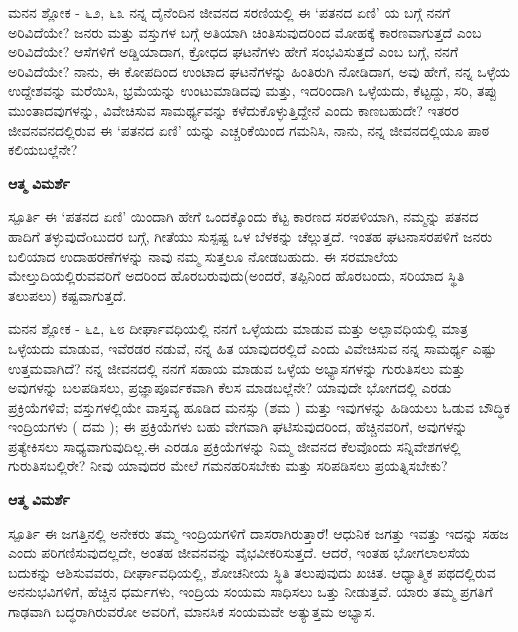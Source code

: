 \newpage
\begin{mananam}{\mananamfont \large {ಮನನ ಶ್ಲೋಕ - ೬೨, ೬೩}}
\footnotesize \mananamtext ನನ್ನ ದೈನೆಂದಿನ ಜೀವನದ ಸರಣಿಯಲ್ಲಿ ಈ ‘ಪತನದ ಏಣಿ’ ಯ  ಬಗ್ಗೆ ನನಗೆ ಅರಿವಿದೆಯೇ? ಜನರು ಮತ್ತು ವಸ್ತುಗಳ ಬಗ್ಗೆ ಅತಿಯಾಗಿ ಚಿಂತಿಸುವುದರಿಂದ ಮೋಹಕ್ಕೆ ಕಾರಣವಾಗುತ್ತದೆ ಎಂಬ ಅರಿವಿದೆಯೇ? ಆಸೆಗಳಿಗೆ  ಅಡ್ಡಿಯಾದಾಗ, ಕ್ರೋಧದ ಘಟನೆಗಳು ಹೇಗೆ ಸಂಭವಿಸುತ್ತದೆ ಎಂಬ ಬಗ್ಗೆ, ನನಗೆ ಅರಿವಿದೆಯೇ? ನಾನು, ಈ ಕೋಪದಿಂದ ಉಂಟಾದ ಘಟನೆಗಳನ್ನು ಹಿಂತಿರುಗಿ ನೋಡಿದಾಗ,  ಅವು ಹೇಗೆ, ನನ್ನ ಒಳ್ಳೆಯ ಉದ್ದೇಶವನ್ನು ಮರೆಯಿಸಿ,  ಭ್ರಮೆಯನ್ನು ಉಂಟುಮಾಡಿದವು ಮತ್ತು,  ಇದರಿಂದಾಗಿ ಒಳ್ಳೆಯದು, ಕೆಟ್ಟದ್ದು, ಸರಿ, ತಪ್ಪು ಮುಂತಾದವುಗಳನ್ನು, ವಿವೇಚಿಸುವ ಸಾಮರ್ಥ್ಯವನ್ನು ಕಳೆದುಕೊಳ್ಳುತ್ತಿದ್ದೇನೆ ಎಂದು ಕಾಣಬಹುದೇ?  ಇತರರ ಜೀವನವನದಲ್ಲಿರುವ ಈ ‘ಪತನದ ಏಣಿ’ ಯನ್ನು ಎಚ್ಚರಿಕೆಯಿಂದ ಗಮನಿಸಿ, ನಾನು, ನನ್ನ ಜೀವನದಲ್ಲಿಯೂ ಪಾಠ ಕಲಿಯಬಲ್ಲೆನೇ?
\end{mananam}
\WritingHand\enspace\textbf{ಆತ್ಮ ವಿಮರ್ಶೆ}
\begin{inspiration}{\mananamfont \large ಸ್ಪೂರ್ತಿ}
\footnotesize \mananamtext ಈ ‘ಪತನದ ಏಣಿ’ ಯಿಂದಾಗಿ ಹೇಗೆ ಒಂದಕ್ಕೊಂದು ಕೆಟ್ಟ ಕಾರಣದ ಸರಪಳಿಯಾಗಿ, ನಮ್ಮನ್ನು ಪತನದ ಹಾದಿಗೆ ತಳ್ಳುವುದೆoಬುದರ ಬಗ್ಗೆ, ಗೀತೆಯು ಸುಸ್ಪಷ್ಟ ಒಳ ಬೆಳಕನ್ನು ಚೆಲ್ಲುತ್ತದೆ. ಇಂತಹ ಘಟನಾಸರಪಳಿಗೆ  ಜನರು ಬಲಿಯಾದ ಉದಾಹರಣೆಗಳನ್ನು ನಾವು ನಮ್ಮ ಸುತ್ತಲೂ ನೋಡಬಹುದು. ಈ ಸರಮಾಲೆಯ ಮೇಲ್ತುದಿಯಲ್ಲಿರುವವರಿಗೆ ಅದರಿಂದ ಹೊರಬರುವುದು(ಅಂದರೆ, ತಪ್ಪಿನಿಂದ ಹೊರಬಂದು, ಸರಿಯಾದ ಸ್ಥಿತಿ ತಲುಪಲು) ಕಷ್ಟವಾಗುತ್ತದೆ. 
\end{inspiration}
\newpage

\begin{mananam}{\mananamfont \large {ಮನನ ಶ್ಲೋಕ - ೬೭, ೬೮}}
\footnotesize \mananamtext ದೀರ್ಘಾವಧಿಯಲ್ಲಿ ನನಗೆ ಒಳ್ಳೆಯದು ಮಾಡುವ ಮತ್ತು ಅಲ್ಪಾವಧಿಯಲ್ಲಿ ಮಾತ್ರ ಒಳ್ಳೆಯದು ಮಾಡುವ,  ಇವೆರಡರ ನಡುವೆ, ನನ್ನ ಹಿತ ಯಾವುದರಲ್ಲಿದೆ ಎಂದು ವಿವೇಚಿಸುವ ನನ್ನ ಸಾಮರ್ಥ್ಯ ಎಷ್ಟು ಉತ್ತಮವಾಗಿದೆ? ನನ್ನ ಜೀವನದಲ್ಲಿ ನನಗೆ ಸಹಾಯ ಮಾಡುವ ಒಳ್ಳೆಯ ಅಭ್ಯಾಸಗಳನ್ನು ಗುರುತಿಸಲು ಮತ್ತು ಅವುಗಳನ್ನು ಬಲಪಡಿಸಲು,  ಪ್ರಜ್ಞಾಪೂರ್ವಕವಾಗಿ ಕೆಲಸ ಮಾಡಬಲ್ಲೆನೇ? 
 ಯಾವುದೇ ಭೋಗದಲ್ಲಿ ಎರಡು ಪ್ರಕ್ರಿಯೆಗಳಿವೆ; ವಸ್ತುಗಳಲ್ಲಿಯೇ ವಾಸ್ತವ್ಯ ಹೂಡಿದ  ಮನಸ್ಸು (ಶಮ ) ಮತ್ತು ಇವುಗಳನ್ನು ಹಿಡಿಯಲು ಓಡುವ  ಬೌದ್ಧಿಕ ಇಂದ್ರಿಯಗಳು ( ದಮ ); ಈ ಪ್ರಕ್ರಿಯೆಗಳು ಬಹು ವೇಗವಾಗಿ ಘಟಿಸುವುದರಿಂದ, ಹೆಚ್ಚಿನವರಿಗೆ, ಅವುಗಳನ್ನು ಪ್ರತ್ಯೇಕಿಸಲು ಸಾಧ್ಯವಾಗುವುದಿಲ್ಲ.ಈ ಎರಡೂ ಪ್ರಕ್ರಿಯೆಗಳನ್ನು ನಿಮ್ಮ ಜೀವನದ ಕೆಲವೊಂದು ಸನ್ನಿವೇಶಗಳಲ್ಲಿ ಗುರುತಿಸಬಲ್ಲಿರೇ? ನೀವು ಯಾವುದರ ಮೇಲೆ ಗಮನಹರಿಸಬೇಕು ಮತ್ತು ಸರಿಪಡಿಸಲು ಪ್ರಯತ್ನಿಸಬೇಕು?
\end{mananam}
\WritingHand\enspace\textbf{ಆತ್ಮ ವಿಮರ್ಶೆ}
\begin{inspiration}{\mananamfont \large ಸ್ಪೂರ್ತಿ}
\footnotesize \mananamtext ಈ ಜಗತ್ತಿನಲ್ಲಿ ಅನೇಕರು ತಮ್ಮ ಇಂದ್ರಿಯಗಳಿಗೆ ದಾಸರಾಗಿರುತ್ತಾರೆ! ಆಧುನಿಕ ಜಗತ್ತು ಇವತ್ತು ಇದನ್ನು ಸಹಜ ಎಂದು ಪರಿಗಣಿಸುವುದಲ್ಲದೇ, ಅಂತಹ ಜೀವನವನ್ನು ವೈಭವೀಕರಿಸುತ್ತದೆ. ಆದರೆ, ಇಂತಹ ಭೋಗಲಾಲಸೆಯ ಬದುಕನ್ನು ಆಶಿಸುವವರು, ದೀರ್ಘಾವಧಿಯಲ್ಲಿ, ಶೋಚನೀಯ ಸ್ಥಿತಿ ತಲುಪುವುದು ಖಚಿತ. ಆಧ್ಯಾತ್ಮಿಕ ಪಥದಲ್ಲಿರುವ ಅನನುಭವಿಗಳಿಗೆ, ಹೆಚ್ಚಿನ ಧರ್ಮಗಳು, ಇಂದ್ರಿಯ ಸಂಯಮ ಸಾಧಿಸಲು ಒತ್ತು ನೀಡುತ್ತವೆ. ಯಾರು ತಮ್ಮ ಪ್ರಗತಿಗೆ ಗಾಢವಾಗಿ ಬದ್ಧರಾಗಿರುವರೋ ಅವರಿಗೆ, ಮಾನಸಿಕ ಸಂಯಮವೇ ಅತ್ಯುತ್ತಮ ಅಭ್ಯಾಸ.
\end{inspiration}
\newpage

